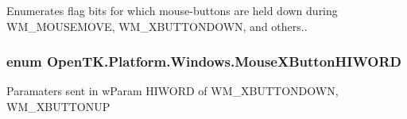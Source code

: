 Enumerates flag bits for which mouse-\/buttons are held down during W\-M\-\_\-\-M\-O\-U\-S\-E\-M\-O\-V\-E, W\-M\-\_\-\-X\-B\-U\-T\-T\-O\-N\-D\-O\-W\-N, and others.. 

\hypertarget{namespace_open_t_k_1_1_platform_1_1_windows_afc978c999990d5fc90fb112bd139b348}{
\subsubsection[{Mouse\-X\-Button\-H\-I\-W\-O\-R\-D}]{\setlength{\rightskip}{0pt plus 5cm}enum {\bf Open\-T\-K.\-Platform.\-Windows.\-Mouse\-X\-Button\-H\-I\-W\-O\-R\-D}}}\label{namespace_open_t_k_1_1_platform_1_1_windows_afc978c999990d5fc90fb112bd139b348}


Paramaters sent in w\-Param H\-I\-W\-O\-R\-D of W\-M\-\_\-\-X\-B\-U\-T\-T\-O\-N\-D\-O\-W\-N, W\-M\-\_\-\-X\-B\-U\-T\-T\-O\-N\-U\-P 

